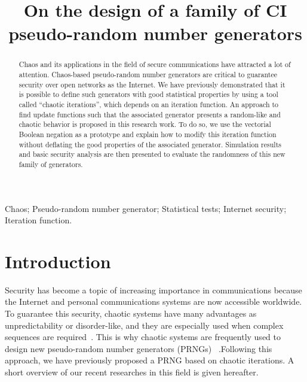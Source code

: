 \documentclass[conference]{IEEEtran}
\begin{document}
\title{On the design of a family of CI pseudo-random number generators}
\author{
}

\maketitle


\begin{abstract}
Chaos and its applications in the field of secure communications have attracted a lot of attention.
Chaos-based pseudo-random number generators are critical to guarantee security over open networks as the Internet.
We have previously demonstrated that it is possible to define such generators with good statistical properties by using a tool called ``chaotic iterations'', which depends on an iteration function.
An approach to find update functions such that the associated generator presents a random-like and chaotic behavior is proposed in this research work.
To do so, we use the vectorial Boolean negation as a prototype and explain how to modify this iteration function without deflating the good properties of the associated generator.
Simulation results and basic security analysis are then presented to evaluate the randomness of this new family of generators.
\end{abstract}


\begin{IEEEkeywords}
Chaos; Pseudo-random number generator; Statistical tests; Internet security; Iteration function.

\end{IEEEkeywords}




\IEEEpeerreviewmaketitle


\section{Introduction}

Security has become a topic of increasing importance in communications because the Internet and personal communications systems are now accessible worldwide.
To guarantee this security, chaotic systems have many advantages as unpredictability or disorder-like, and they are especially used when complex sequences are required~\cite{Behnia20113455,Hu20092286,DeMicco20083373}.
This is why chaotic systems are frequently used to design new pseudo-random number generators (PRNGs) ~\cite{Behnia20113455,Niansheng}.Following this approach, we have previously proposed a PRNG based on chaotic iterations. A short overview of our recent researches in this field is given hereafter.
\end{document}
